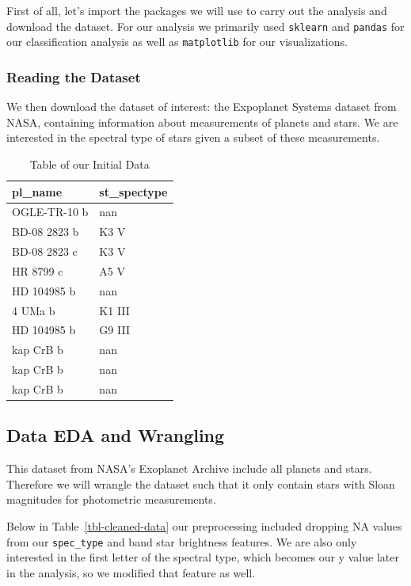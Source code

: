 \documentclass[
  letterpaper,
  DIV=11,
  numbers=noendperiod]{scrartcl}
\begin{document}
First of all, let's import the packages we will use to carry out the
analysis and download the dataset. For our analysis we primarily used
\texttt{sklearn} and \texttt{pandas} for our classification analysis as
well as \texttt{matplotlib} for our visualizations.

\subsubsection{Reading the Dataset}\label{reading-the-dataset}

We then download the dataset of interest: the Expoplanet Systems dataset
from NASA, containing information about measurements of planets and
stars. We are interested in the spectral type of stars given a subset of
these measurements.

\begin{longtable}[]{@{}ll@{}}

\caption{\label{tbl-read-data}Table of our Initial Data}

\tabularnewline

\toprule\noalign{}
pl\_name & st\_spectype \\
\midrule\noalign{}
\endhead
\bottomrule\noalign{}
\endlastfoot
OGLE-TR-10 b & nan \\
BD-08 2823 b & K3 V \\
BD-08 2823 c & K3 V \\
HR 8799 c & A5 V \\
HD 104985 b & nan \\
4 UMa b & K1 III \\
HD 104985 b & G9 III \\
kap CrB b & nan \\
kap CrB b & nan \\
kap CrB b & nan \\

\end{longtable}

\subsection{Data EDA and Wrangling}\label{data-eda-and-wrangling}

This dataset from NASA's Exoplanet Archive include all planets and
stars. Therefore we will wrangle the dataset such that it only contain
stars with Sloan magnitudes for photometric measurements.

Below in Table~\ref{tbl-cleaned-data} our preprocessing included
dropping NA values from our \texttt{spec\_type} and band star brightness
features. We are also only interested in the first letter of the
spectral type, which becomes our y value later in the analysis, so we
modified that feature as well.
\end{document}
